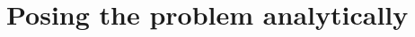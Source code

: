 
 
 
 \chapter{Posing the problem analytically}
 \label{chap:Posing}
 
\startappendices


 \label{app:Appendix1}
 
 
 
 
 
 \nocite{*} %
\startbibliography
 \begin{singlespace} %
 \end{singlespace}


